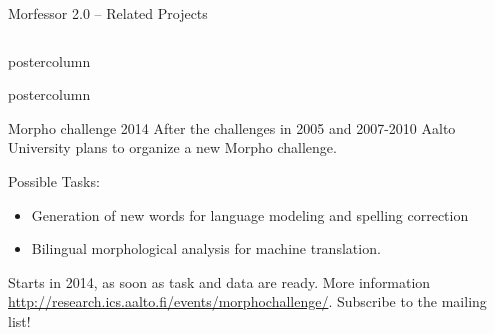 \documentclass[final]{beamer} %
\begin{document}
\begin{frame}{Morfessor 2.0 -- Related Projects}
\begin{columns}
\begin{column}{.49\textwidth}
\begin{beamercolorbox}[center,wd=\textwidth]{postercolumn}
	\end{beamercolorbox}
\vfill



  \begin{beamercolorbox}[center,wd=\textwidth]{postercolumn}
 \begin{block}{Morpho challenge 2014}
            After the challenges in 2005 and 2007-2010 Aalto University plans to organize a new Morpho challenge.

	Possible Tasks:       \begin{itemize}
		\item Generation of new words for language modeling and spelling correction
\item Bilingual morphological analysis for machine translation.
              \end{itemize}  

Starts in 2014, as soon as task and data are ready. More information \url{http://research.ics.aalto.fi/events/morphochallenge/}. Subscribe to the mailing list!
            \end{block}
            
	\end{beamercolorbox}




\end{column}
\end{columns}
\end{frame}
\end{document}
